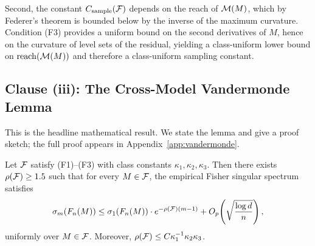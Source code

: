 Second, the constant $C_{\text{sample}}(\mathcal{F})$ depends on the reach of $\mathcal{M}(M)$, which by Federer's theorem\cite{federer1959curvature} is bounded below by the inverse of the maximum curvature. Condition (F3) provides a uniform bound on the second derivatives of $M$, hence on the curvature of level sets of the residual, yielding a class-uniform lower bound on $\mathrm{reach}(\mathcal{M}(M))$ and therefore a class-uniform sampling constant.

\subsection{Clause (iii): The Cross-Model Vandermonde Lemma}\label{sec:vandermonde-proof}

This is the headline mathematical result. We state the lemma and give a proof sketch; the full proof appears in Appendix~\ref{app:vandermonde}.

\begin{lemma}\label{lem:vandermonde}
Let $\mathcal{F}$ satisfy (F1)--(F3) with class constants $\kappa_1, \kappa_2, \kappa_3$. Then there exists $\rho(\mathcal{F}) \geq 1.5$ such that for every $M \in \mathcal{F}$, the empirical Fisher singular spectrum satisfies
\begin{equation}\label{eq:vandermonde-statement}
    \sigma_m(F_n(M)) \leq \sigma_1(F_n(M)) \cdot e^{-\rho(\mathcal{F})(m-1)} + O_p\!\left(\sqrt{\frac{\log d}{n}}\right),
\end{equation}
uniformly over $M \in \mathcal{F}$. Moreover, $\rho(\mathcal{F}) \leq C \kappa_1^{-1} \kappa_2 \kappa_3$.
\end{lemma}

